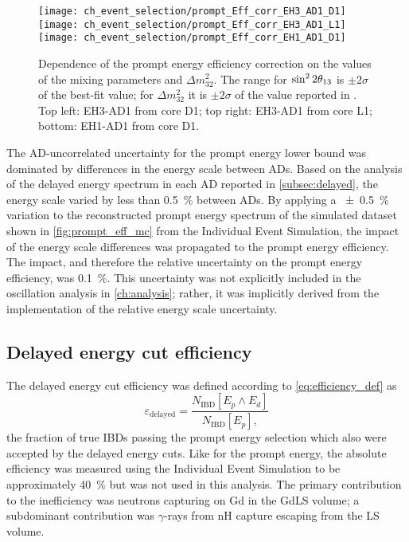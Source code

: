 \begin{figure}
    \centering
    \texttt{[image: ch\_event\_selection/prompt\_Eff\_corr\_EH3\_AD1\_D1]}
    \texttt{[image: ch\_event\_selection/prompt\_Eff\_corr\_EH3\_AD1\_L1]}
    \\
    \texttt{[image: ch\_event\_selection/prompt\_Eff\_corr\_EH1\_AD1\_D1]}
    \caption[Prompt efficiency correction contour maps]{
        Dependence of the prompt energy efficiency correction
        on the values of the mixing parameters \thetaot{} and $\Delta m^2_{32}$.
        The range for $\sin^22\theta_{13}{}$ is $\pm2\sigma$ of the best-fit value;
        for $\Delta m^2_{32}$ it is $\pm2\sigma$ of the value reported in \cite{ngd2018}.
        Top left: EH3-AD1 from core D1;
        top right: EH3-AD1 from core L1;
        bottom: EH1-AD1 from core D1.
    }
    \label{fig:prompt_eff_osc_contour}
\end{figure}

The AD-uncorrelated uncertainty for the prompt energy lower bound
was dominated by differences in the energy scale between ADs.
Based on the analysis of the delayed energy spectrum in each AD
reported in \cref{subsec:delayed}, the energy scale
varied by less than \SI{0.5}{\percent} between ADs.
By applying a \SI{+-0.5}{\percent} variation to
the reconstructed prompt energy spectrum of the simulated dataset
shown in \cref{fig:prompt_eff_mc} from the Individual Event Simulation,
the impact of the energy scale differences was propagated
to the prompt energy efficiency.
The impact, and therefore the relative uncertainty on
the prompt energy efficiency, was \SI{0.1}{\percent}.
This uncertainty was not explicitly included in the
oscillation analysis in \cref{ch:analysis};
rather, it was implicitly derived from the
implementation of the relative energy scale uncertainty.

\subsection{Delayed energy cut efficiency}
\label{subsec:eff_delayed}

The delayed energy cut efficiency was defined according to \cref{eq:efficiency_def} as
\begin{equation}\label{eq:delayed_eff}
    \varepsilon_\text{delayed} = \frac{N_\text{IBD}[E_p \wedge E_d]}{
        N_\text{IBD}[E_p],
    }
\end{equation}
the fraction of true IBDs passing the prompt energy selection
which also were accepted by the delayed energy cuts.
Like for the prompt energy, the absolute efficiency
was measured using the Individual Event Simulation to be approximately \SI{40}{\percent}
but was not used in this analysis.
The primary contribution to the inefficiency
was neutrons capturing on Gd in the GdLS volume;
a subdominant contribution was $\gamma$-rays from nH capture escaping from the LS volume.

